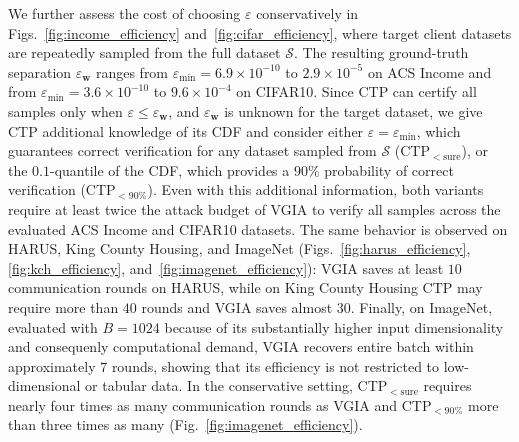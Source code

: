 We further assess the cost of choosing $\varepsilon$ conservatively in Figs.~\ref{fig:income_efficiency} and~\ref{fig:cifar_efficiency}, where target client datasets are repeatedly sampled from the full dataset $\mathcal S$. The resulting ground-truth separation $\varepsilon_{\mathbf w}$ ranges from $\varepsilon_{\min}=6.9\times10^{-10}$ to $2.9\times10^{-5}$ on ACS Income and from $\varepsilon_{\min}=3.6\times10^{-10}$ to $9.6\times10^{-4}$ on CIFAR10. Since CTP can certify all samples only when $\varepsilon\leq\varepsilon_{\mathbf w}$, and $\varepsilon_{\mathbf w}$ is unknown for the target dataset, we give CTP additional knowledge of its CDF and consider either $\varepsilon=\varepsilon_{\min}$, which guarantees correct verification for any dataset sampled from $\mathcal S$ (CTP$_{<\mathrm{sure}}$), or the $0.1$-quantile of the CDF, which provides a $90\%$ probability of correct verification (CTP$_{<90\%}$). Even with this additional information, both variants require at least twice the attack budget of VGIA to verify all samples across the evaluated ACS Income and CIFAR10 datasets. The same behavior is observed on HARUS, King County Housing, and ImageNet (Figs.~\ref{fig:harus_efficiency}, \ref{fig:kch_efficiency}, and~\ref{fig:imagenet_efficiency}): VGIA saves at least $10$ communication rounds on HARUS, while on King County Housing CTP may require more than $40$ rounds and VGIA saves almost $30$. Finally, on ImageNet, evaluated with $B=1024$ because of its substantially higher input dimensionality and consequenly computational demand, VGIA recovers entire batch within approximately $7$ rounds, showing that its efficiency is not restricted to low-dimensional or tabular data. In the conservative setting, CTP$_{<\mathrm{sure}}$ requires nearly four times as many communication rounds as VGIA and CTP$_{<90\%}$ more than three times as many (Fig.~\ref{fig:imagenet_efficiency}). 


